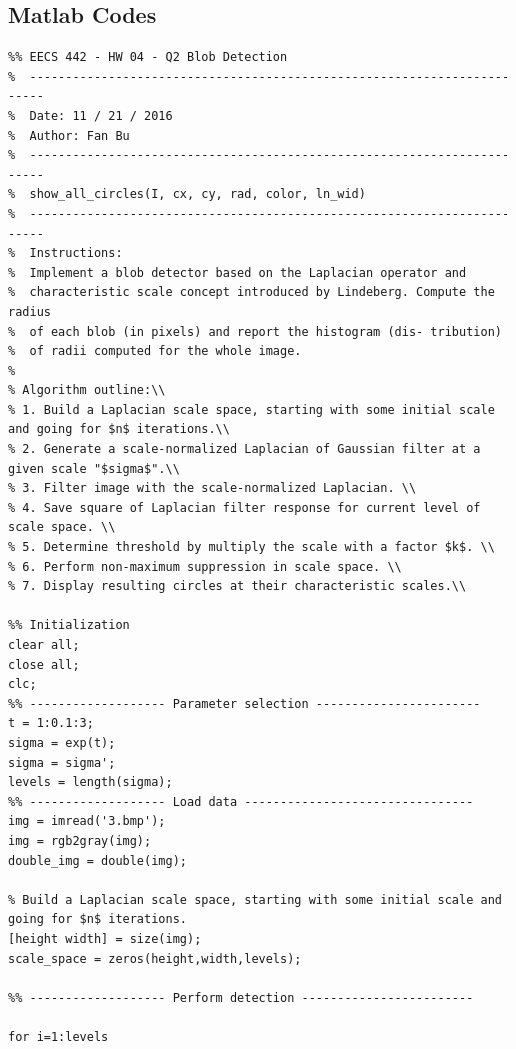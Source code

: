 \documentclass[letterpaper]{article}
\begin{document}
\subsection*{Matlab Codes}
\begin{lstlisting}
%% EECS 442 - HW 04 - Q2 Blob Detection
%  ------------------------------------------------------------------------
%  Date: 11 / 21 / 2016
%  Author: Fan Bu
%  ------------------------------------------------------------------------
%  show_all_circles(I, cx, cy, rad, color, ln_wid)
%  ------------------------------------------------------------------------
%  Instructions:
%  Implement a blob detector based on the Laplacian operator and
%  characteristic scale concept introduced by Lindeberg. Compute the radius
%  of each blob (in pixels) and report the histogram (dis- tribution)
%  of radii computed for the whole image.
%
% Algorithm outline:\\
% 1. Build a Laplacian scale space, starting with some initial scale and going for $n$ iterations.\\
% 2. Generate a scale-normalized Laplacian of Gaussian filter at a given scale "$sigma$".\\
% 3. Filter image with the scale-normalized Laplacian. \\
% 4. Save square of Laplacian filter response for current level of scale space. \\
% 5. Determine threshold by multiply the scale with a factor $k$. \\
% 6. Perform non-maximum suppression in scale space. \\
% 7. Display resulting circles at their characteristic scales.\\

%% Initialization
clear all;
close all;
clc;
%% ------------------- Parameter selection -----------------------
t = 1:0.1:3;
sigma = exp(t);
sigma = sigma';
levels = length(sigma);
%% ------------------- Load data --------------------------------
img = imread('3.bmp');
img = rgb2gray(img);
double_img = double(img);

% Build a Laplacian scale space, starting with some initial scale and going for $n$ iterations.
[height width] = size(img);
scale_space = zeros(height,width,levels);

%% ------------------- Perform detection ------------------------

for i=1:levels


\end{lstlisting}
\end{document}
